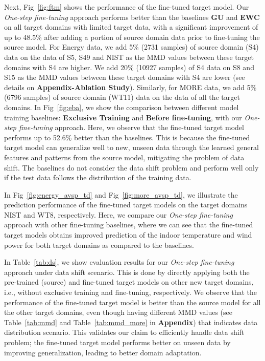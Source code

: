 \documentclass[letterpaper]{article} %
\begin{document}
Next, Fig~\ref{fig:ftm} shows the performance of the fine-tuned target model. Our \emph{One-step fine-tuning} approach performs better than the baselines \textbf{GU} and \textbf{EWC} on all target domains with limited target data, with a significant improvement of up to 48.5\% after adding a portion of source domain data prior to fine-tuning the source model. For Energy data, we add 5\% (2731 samples) of source domain (S4) data on the data of S5, S49 and NIST as the MMD values between these target domains with S4 are higher. We add 20\% (10927 samples) of S4 data on S8 and S15 as the MMD values between these target domains with S4 are lower (see details on \textbf{Appendix-Ablation Study}). Similarly, for MORE data, we add 5\% (6796 samples) of source domain (WT11) data on the data of all the target domains. In Fig~\ref{fig:eba}, we show the comparison between different model training baselines: \textbf{Exclusive Training} and \textbf{Before fine-tuning}, with our \emph{One-step fine-tuning} approach. Here, we observe that the fine-tuned target model performs up to 52.6\% better than the baselines. This is because the fine-tuned target model can generalize well to new, unseen data through the learned general features and patterns from the source model, mitigating the problem of data shift. The baselines do not consider the data shift problem and perform well only if the test data follows the distribution of the training data.

In Fig~\ref{fig:energy_avsp_td} and Fig~\ref{fig:more_avsp_td}, we illustrate the prediction performance of the fine-tuned target models on the target domains NIST and WT8, respectively. Here, we compare our \emph{One-step fine-tuning} approach with other fine-tuning baselines, where we can see that the fine-tuned target models obtains improved prediction of the indoor temperature and wind power for both target domains as compared to the baselines.

In Table~\ref{tab:ds}, we show evaluation results for our \emph{One-step fine-tuning} approach under data shift scenario. This is done by directly applying both the pre-trained (source) and fine-tuned target models on other new target domains, i.e., without exclusive training and fine-tuning, respectively. We observe that the performance of the fine-tuned target model is better than the source model for all the other target domains, even though having different MMD values (see Table~\ref{tab:mmd} and Table~\ref{tab:mmd_more} in \textbf{Appendix}) that indicates data distribution scenario. This validates our claim to efficiently handle data shift problem; the fine-tuned target model performs better on unseen data by improving generalization, leading to better domain adaptation.
\end{document}
